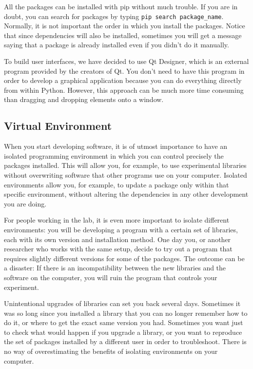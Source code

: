 All the packages can be installed with pip without much trouble. If you are in doubt, you can search for packages by typing \texttt{pip search package_name}. Normally, it is not important the order in which you install the packages. Notice that since dependencies will also be installed, sometimes you will get a message saying that a package is already installed even if you didn't do it manually. 

To build user interfaces, we have decided to use Qt Designer, which is an external program provided by the creators of Qt. You don't need to have this program in order to develop a graphical application because you can do everything directly from within Python. However, this approach can be much more time consuming than dragging and dropping elements onto a window.

\subsection{Virtual Environment}
When you start developing software, it is of utmost importance to have an isolated programming environment in which you can control precisely the packages installed. This will allow you, for example, to use experimental libraries without overwriting software that other programs use on your computer. Isolated environments allow you, for example, to update a package only within that specific environment, without altering the dependencies in any other development you are doing.

For people working in the lab, it is even more important to isolate different environments: you will be developing a program with a certain set of libraries, each with its own version and installation method. One day you, or another researcher who works with the same setup, decide to try out a program that requires slightly different versions for some of the packages. The outcome can be a disaster: If there is an incompatibility between the new libraries and the software on the computer, you will ruin the program that controls your experiment.

Unintentional upgrades of libraries can set you back several days. Sometimes it was so long since you installed a library that you can no longer remember how to do it, or where to get the exact same version you had. Sometimes you want just to check what would happen if you upgrade a library, or you want to reproduce the set of packages installed by a different user in order to troubleshoot. There is no way of overestimating the benefits of isolating environments on your computer. 

